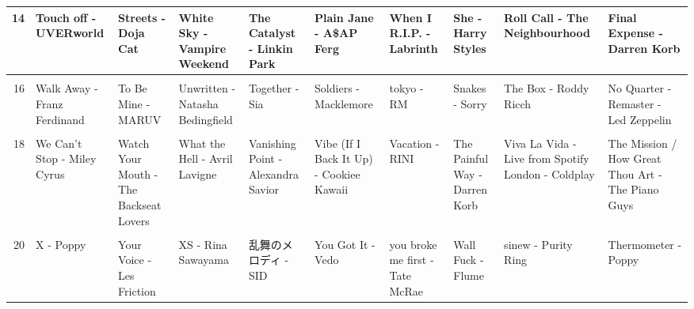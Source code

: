 \documentclass[
]{article}
\begin{document}
\begin{table}
\begin{tabular}{r|l|l|l|l|l|l|l|l|l}
\hline
14 & Touch off - UVERworld & Streets - Doja Cat & White Sky - Vampire Weekend & The Catalyst - Linkin Park & Plain Jane - A\$AP Ferg & When I R.I.P. - Labrinth & She - Harry Styles & Roll Call - The Neighbourhood & Final Expense - Darren Korb\\
\hline
\cellcolor{gray!6}{15} & \cellcolor{gray!6}{Up\&Up - Coldplay} & \cellcolor{gray!6}{THE NEWS - PARTYNEXTDOOR} & \cellcolor{gray!6}{You'll miss me when I'm not around - Grimes} & \cellcolor{gray!6}{The Holy Mountain - Poppy} & \cellcolor{gray!6}{Show \& Tell - Melanie Martinez} & \cellcolor{gray!6}{Will He - Joji} & \cellcolor{gray!6}{Skin - Grimes} & \cellcolor{gray!6}{Sorrows - Bryson Tiller} & \cellcolor{gray!6}{Karl - M83}\\
\hline
16 & Walk Away - Franz Ferdinand & To Be Mine - MARUV & Unwritten - Natasha Bedingfield & Together - Sia & Soldiers - Macklemore & tokyo - RM & Snakes - Sorry & The Box - Roddy Ricch & No Quarter - Remaster - Led Zeppelin\\
\hline
\cellcolor{gray!6}{17} & \cellcolor{gray!6}{Washing Machine Heart - Mitski} & \cellcolor{gray!6}{To Me - Alina Baraz} & \cellcolor{gray!6}{Vowels = space and time - Grimes} & \cellcolor{gray!6}{Use Somebody - Kings of Leon} & \cellcolor{gray!6}{Sorry Not Sorry - Demi Lovato} & \cellcolor{gray!6}{The A Team - Ed Sheeran} & \cellcolor{gray!6}{The Antichrist - Slayer} & \cellcolor{gray!6}{The Violence - Asking Alexandria} & \cellcolor{gray!6}{Philosophy of Time Travel - Michael Andrews}\\
\hline
18 & We Can't Stop - Miley Cyrus & Watch Your Mouth - The Backseat Lovers & What the Hell - Avril Lavigne & Vanishing Point - Alexandra Savior & Vibe (If I Back It Up) - Cookiee Kawaii & Vacation - RINI & The Painful Way - Darren Korb & Viva La Vida - Live from Spotify London - Coldplay & The Mission / How Great Thou Art - The Piano Guys\\
\hline
\cellcolor{gray!6}{19} & \cellcolor{gray!6}{Why - Dominic Fike} & \cellcolor{gray!6}{White Flag - Daughtry} & \cellcolor{gray!6}{Wheels on the Bus - Melanie Martinez} & \cellcolor{gray!6}{White Flag - Dido} & \cellcolor{gray!6}{WTF Are We Talking For - Labrinth} & \cellcolor{gray!6}{Within - Daft Punk} & \cellcolor{gray!6}{Truly - Cigarettes After Sex} & \cellcolor{gray!6}{Winter Wonderland - Leona Lewis} & \cellcolor{gray!6}{The Theory of Everything - Jóhann Jóhannsson}\\
\hline
20 & X - Poppy & Your Voice - Les Friction & XS - Rina Sawayama & 乱舞のメロディ - SID & You Got It - Vedo & you broke me first - Tate McRae & Wall Fuck - Flume & sinew - Purity Ring & Thermometer - Poppy\\
\hline
\end{tabular}
\end{table}
\end{document}
